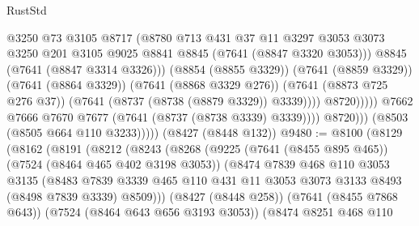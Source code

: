 \begin{lexlean}{RustStd}
\begin{coremodule}
                                    @3250
                                    @73
                                    @3105
                                    @8717
                                    (@8780
                                      @713
                                      @431
                                      @37
                                      @11
                                      @3297
                                      @3053
                                      @3073
                                      @3250
                                      @201
                                      @3105
                                      @9025
                                      @8841
                                      @8845
                                      (@7641 (@8847 @3320 @3053)))
                                    @8845
                                    (@7641 (@8847 @3314 @3326)))
                                  (@8854 (@8855 @3329))
                                  (@7641 (@8859 @3329))
                                  (@7641 (@8864 @3329))
                                  (@7641 (@8868 @3329 @276))
                                  (@7641 (@8873 @725 @276 @37))
                                  (@7641 (@8737 (@8738 (@8879 @3329)) @3339))))
                              @8720)))))
                    @7662
                    @7666
                    @7670
                    @7677
                    (@7641 (@8737 (@8738 @3339) @3339))))
                @8720)))
          (@8503 (@8505 @664 @110 @3233)))))
    (@8427 (@8448 @132))
@9480 := @8100
    (@8129
      (@8162
        (@8191
          (@8212
            (@8243
              (@8268
                (@9225
                  (@7641 (@8455 @895 @465))
                  (@7524 (@8464 @465 @402 @3198 @3053))
                  (@8474
                    @7839
                    @468
                    @110
                    @3053
                    @3135
                    (@8483
                      @7839
                      @3339
                      @465
                      @110
                      @431
                      @11
                      @3053
                      @3073
                      @3133
                      @8493
                      (@8498 @7839 @3339)
                      @8509)))
                (@8427 (@8448 @258))
                (@7641 (@8455 @7868 @643))
                (@7524 (@8464 @643 @656 @3193 @3053))
                (@8474
                  @8251
                  @468
                  @110

\end{coremodule}
\end{lexlean}
